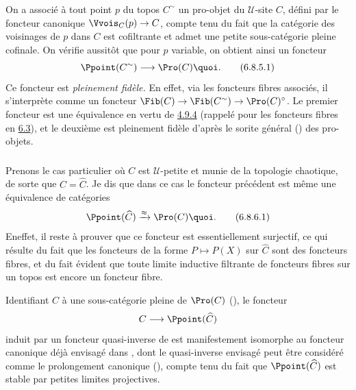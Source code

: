 \documentclass[10pt]{../fichiers-configuration-latex/smfart}
\begin{document}
\setcounter{subsubsection}{4}
\subsubsection{}
On a associé à tout point $p$ du topos $C^{\sim}$ un pro-objet du
$𝒰$-site $C$, défini par le foncteur canonique
$\Vvois_C(p)\rightarrow C$, compte tenu du fait que la catégorie des
voisinages de $p$ dans $C$ est cofiltrante et admet une petite
sous-catégorie pleine cofinale. On vérifie aussitôt que pour $p$
variable, on obtient ainsi un foncteur
\begin{equation*}
\Ppoint(C^{\sim})\longrightarrow \Pro(C){\quoi}.\tag{6.8.5.1}
\end{equation*}
Ce foncteur est \emph{pleinement fidèle.} En effet, via les
foncteurs fibres associés, il s'interprète comme un foncteur
$\Fib(C)\rightarrow \Fib(C^{\sim})\rightarrow \Pro(C)^{\circ}$. Le
premier foncteur est une équivalence en vertu de \hyperref[IV.prop4.9.4]{4.9.4}
(rappelé pour les foncteurs fibres en \hyperref[IV.subsec6.3]{6.3}), et le
deuxième est pleinement fidèle d'après le sorite général
() des pro-objets.

\subsubsection{}
Prenons le cas particulier où $C$ est $𝒰$-petite et munie de
la topologie chaotique, de sorte que $C=\widehat{C}$. Je dis que
dans ce cas le foncteur précédent est même une équivalence de
catégories
\begin{equation*}
\Ppoint(\widehat{C})\xrightarrow{\approx}\Pro(C){\quoi}.\tag{6.8.6.1}
\end{equation*}
En\pageoriginale effet, il reste à prouver que ce foncteur est
essentiellement surjectif, ce qui résulte du fait que les foncteurs
de la forme $P\mapsto P(X)$ sur $\widehat{C}$ sont des foncteurs
fibres, et du fait évident que toute limite inductive filtrante de
foncteurs fibres sur un topos est encore un foncteur fibre.

Identifiant $C$ à une sous-catégorie pleine de $\Pro(C)$
(), le foncteur
$$
C\longrightarrow \Ppoint(\widehat{C})
$$
induit par un foncteur quasi-inverse de  est manifestement
isomorphe au foncteur canonique déjà envisagé dans
,
dont le quasi-inverse envisagé peut être considéré comme le
prolongement canonique (), compte tenu du fait que
$\Ppoint(\widehat{C})$ est stable par petites limites projectives.
\end{document}
